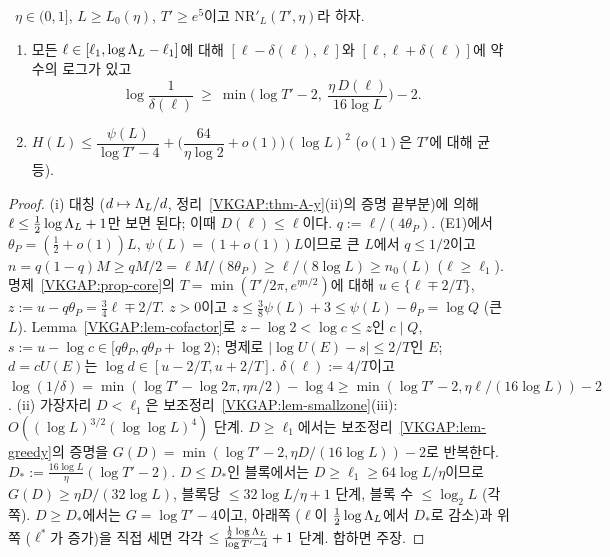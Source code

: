 \begin{theorem}\label{VKGAP:thm-transfer}
\ $\eta\in(0,1]$, $L\ge L_0(\eta)$, $T'\ge e^5$이고 $\mathrm{NR}'_L(T',\eta)$라 하자.
\begin{enumerate}[label=(\roman*)]
\item 모든 $\ell\in[\ell_1,\log\Lambda_L-\ell_1]$에 대해 $[\ell-\delta(\ell),\ell]$와 $[\ell,\ell+\delta(\ell)]$에 약수의 로그가 있고
\[
\log\frac1{\delta(\ell)}\ \ge\ \min\Big(\log T'-2,\ \frac{\eta\,D(\ell)}{16\log L}\Big)-2 .
\]
\item $H(L)\le\dfrac{\psi(L)}{\log T'-4}+\Big(\dfrac{64}{\eta\log2}+o(1)\Big)(\log L)^2$ ($o(1)$은 $T'$에 대해 균등).
\end{enumerate}
\end{theorem}
\begin{proof}
(i) 대칭 ($d\mapsto\Lambda_L/d$, 정리~\ref{VKGAP:thm-A-y}(ii)의 증명 끝부분)에 의해 $\ell\le\frac12\log\Lambda_L+1$만 보면 된다; 이때 $D(\ell)\le\ell$이다.
$q:=\ell/(4\theta_P)$. (E1)에서 $\theta_P=(\frac12+o(1))L$, $\psi(L)=(1+o(1))L$이므로 큰 $L$에서 $q\le1/2$이고
$n=q(1-q)M\ge qM/2=\ell M/(8\theta_P)\ge\ell/(8\log L)\ge n_0(L)$ ($\ell\ge\ell_1$). 명제~\ref{VKGAP:prop-core}의 $T=\min(T'/2\pi,e^{\eta n/2})$에 대해
$u\in\{\ell\mp2/T\}$, $z:=u-q\theta_P=\frac34\ell\mp2/T$. $z>0$이고 $z\le\frac38\psi(L)+3\le\psi(L)-\theta_P=\log Q$ (큰 $L$).
Lemma~\ref{VKGAP:lem-cofactor}로 $z-\log2<\log c\le z$인 $c\mid Q$, $s:=u-\log c\in[q\theta_P,q\theta_P+\log2)$; 명제로 $|\log U(E)-s|\le2/T$인 $E$;
$d=cU(E)$는 $\log d\in[u-2/T,u+2/T]$. $\delta(\ell):=4/T$이고
$\log(1/\delta)=\min(\log T'-\log2\pi,\eta n/2)-\log4\ge\min(\log T'-2,\eta\ell/(16\log L))-2$.
(ii) 가장자리 $D<\ell_1$은 보조정리~\ref{VKGAP:lem-smallzone}(iii): $O((\log L)^{3/2}(\log\log L)^4)$ 단계. $D\ge\ell_1$에서는
보조정리~\ref{VKGAP:lem-greedy}의 증명을 $G(D)=\min(\log T'-2,\eta D/(16\log L))-2$로 반복한다. $D_*:=\frac{16\log L}{\eta}(\log T'-2)$.
$D\le D_*$인 블록에서는 $D\ge\ell_1\ge64\log L/\eta$이므로 $G(D)\ge\eta D/(32\log L)$, 블록당 $\le32\log L/\eta+1$ 단계, 블록 수 $\le\log_2L$ (각 쪽).
$D\ge D_*$에서는 $G=\log T'-4$이고, 아래쪽 ($\ell$이 $\frac12\log\Lambda_L$에서 $D_*$로 감소)과 위쪽 ($\ell^*$가 증가)을 직접 세면 각각
$\le\frac{\frac12\log\Lambda_L}{\log T'-4}+1$ 단계. 합하면 주장.
\end{proof}

